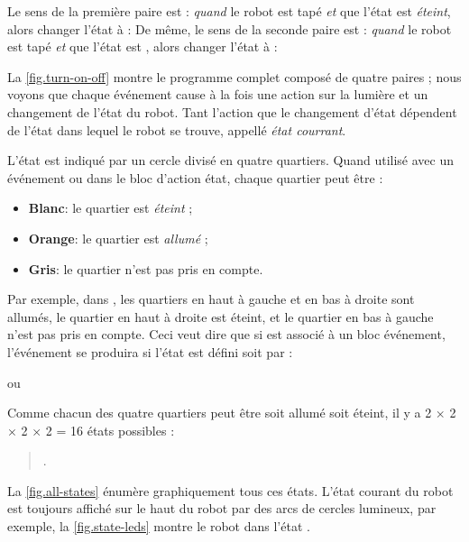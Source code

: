 Le sens de la première paire est : \emph{quand} le robot est tapé \emph{et} que l'état est \emph{éteint}, alors changer l'état à  : 
De même, le sens de la seconde paire est : \emph{quand} le robot est tapé \emph{et} que l'état est , alors changer l'état à  : 

La \cref{fig.turn-on-off} montre le programme complet composé de quatre paires ; nous voyons que chaque événement cause à la fois une action sur la lumière et un changement de l'état du robot.
Tant l'action que le changement d'état dépendent de l'état dans lequel le robot se trouve, appellé \emph{état courrant}.



L'état est indiqué par un cercle divisé en quatre quartiers.
Quand utilisé avec un événement ou dans le bloc d'action état, chaque quartier peut être :
\begin{itemize}
	\item \textbf{Blanc}: le quartier est \emph{éteint} ;
	\item \textbf{Orange}: le quartier est \emph{allumé} ;
	\item \textbf{Gris}: le quartier n'est pas pris en compte.
\end{itemize}

Par exemple, dans , les quartiers en haut à gauche et en bas à droite sont allumés, le quartier en haut à droite est éteint, et le quartier en bas à gauche n'est pas pris en compte.
Ceci veut dire que si  est associé à un bloc événement, l'événement se produira si l'état est défini soit par :
\begin{center}
\centering {}\quad ou \quad {}
\end{center}

Comme chacun des quatre quartiers peut être soit allumé soit éteint, il y a 2 $\times$ 2 $\times$ 2 $\times$ 2 = 16 états possibles :
\begin{quote}
.
\end{quote}
La \cref{fig.all-states} énumère graphiquement tous ces états.
L'état courant du robot est toujours affiché sur le haut du robot par des arcs de cercles lumineux, par exemple, la \cref{fig.state-leds} montre le robot dans l'état .

